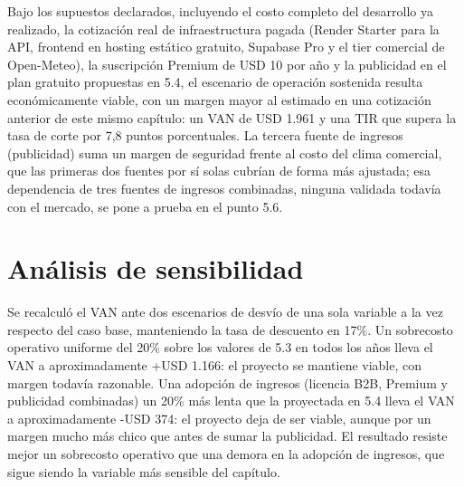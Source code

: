 Bajo los supuestos declarados, incluyendo el costo completo del
desarrollo ya realizado, la cotización real de infraestructura pagada
(Render Starter para la API, frontend en hosting estático gratuito,
Supabase Pro y el tier comercial de Open-Meteo), la suscripción Premium
de USD 10 por año y la publicidad en el plan gratuito propuestas en 5.4,
el escenario de operación sostenida resulta económicamente viable, con
un margen mayor al estimado en una cotización anterior de este mismo
capítulo: un VAN de USD 1.961 y una TIR que supera la tasa de corte por
7,8 puntos porcentuales. La tercera fuente de ingresos (publicidad) suma
un margen de seguridad frente al costo del clima comercial, que las
primeras dos fuentes por sí solas cubrían de forma más ajustada; esa
dependencia de tres fuentes de ingresos combinadas, ninguna validada
todavía con el mercado, se pone a prueba en el punto 5.6.

\section{Análisis de sensibilidad}

Se recalculó el VAN ante dos escenarios de desvío de una sola variable a
la vez respecto del caso base, manteniendo la tasa de descuento en 17\%.
Un sobrecosto operativo uniforme del 20\% sobre los valores de 5.3 en
todos los años lleva el VAN a aproximadamente +USD 1.166: el proyecto se
mantiene viable, con margen todavía razonable. Una adopción de ingresos
(licencia B2B, Premium y publicidad combinadas) un 20\% más lenta que la
proyectada en 5.4 lleva el VAN a aproximadamente -USD 374: el proyecto
deja de ser viable, aunque por un margen mucho más chico que antes de
sumar la publicidad. El resultado resiste mejor un sobrecosto operativo
que una demora en la adopción de ingresos, que sigue siendo la variable
más sensible del capítulo.

